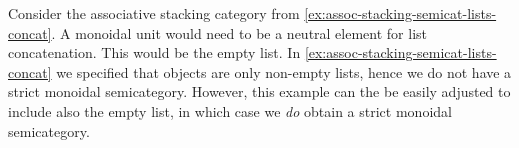 \begin{example}
    Consider the associative stacking category from \cref{ex:assoc-stacking-semicat-lists-concat}.
    A monoidal unit would need to be a neutral element for list concatenation.
    This would be the empty list.
    In \cref{ex:assoc-stacking-semicat-lists-concat} we specified that objects are only non-empty lists, hence we do not have a strict monoidal semicategory.
    However, this example can the be easily adjusted to include also the empty list, in which case we \emph{do} obtain a strict monoidal semicategory.
\end{example}




